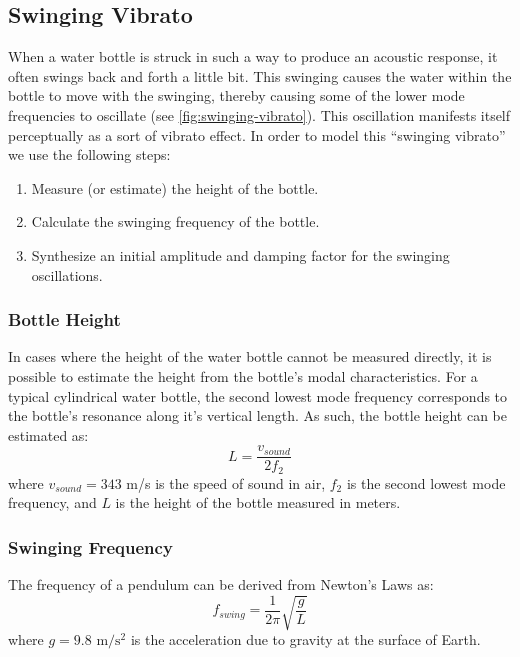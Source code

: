 \documentclass[twoside,a4paper]{article}
\begin{document}
\subsection{Swinging Vibrato} \label{sec:swing}
%
When a water bottle is struck in such a way to produce an acoustic
response, it often swings back and forth a little bit. This swinging
causes the water within the bottle to move with the swinging, thereby
causing some of the lower mode frequencies to oscillate (see
\cref{fig:swinging-vibrato}). This oscillation
manifests itself perceptually as a sort of vibrato effect. In
order to model this ``swinging vibrato'' we use the following
steps:
\begin{enumerate}
    \item Measure (or estimate) the height of the bottle.
    \item Calculate the swinging frequency of the bottle.
    \item Synthesize an initial amplitude and damping factor
        for the swinging oscillations.
\end{enumerate}
%
\subsubsection{Bottle Height}
%
In cases where the height of the water bottle cannot be measured directly,
it is possible to estimate the height from the bottle's modal characteristics.
For a typical cylindrical water bottle, the second lowest mode frequency
corresponds to the bottle's resonance along it's vertical length. As such,
the bottle height can be estimated as:
\begin{equation}
    L = \frac{v_{sound}}{2 f_2}
    \label{eq:bottle-height}
\end{equation}
where $v_{sound} = 343$ m/s is the speed of sound in air, $f_2$ is the second
lowest mode frequency, and $L$ is the height of the bottle measured in meters.
%
\subsubsection{Swinging Frequency}
%
The frequency of a pendulum can be derived from Newton's Laws as:
\begin{equation}
    f_{swing} = \frac{1}{2\pi} \sqrt{\frac{g}{L}}
    \label{eq:swing-freq}
\end{equation}
where $g = 9.8 \text{ m}/\text{s}^2$ is the acceleration due to gravity at the surface
of Earth.
%
\end{document}
